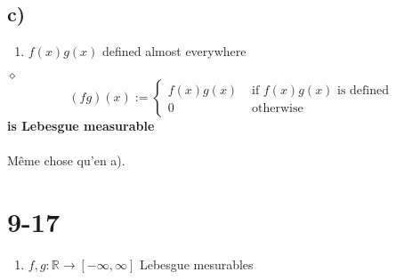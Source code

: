 \documentclass[a4paper,10pt]{article}
\begin{document}
\subsection*{c)}
\begin{enumerate}
	\item $f(x)g(x)$ defined almost everywhere
\end{enumerate}
$\diamond$ 
$$
	(fg)(x) := 
	\begin{cases}
		f(x)g(x) & \text{ if } f(x)g(x) \text{ is defined} \\
		0 & \text{ otherwise}
	\end{cases}
$$
\textbf{ is Lebesgue measurable}
\\
\\
Même chose qu'en a).

\section*{9-17}
\begin{enumerate}
	\item $f,g : \mathbb{R} \rightarrow [-\infty, \infty]$ Lebesgue mesurables
\end{enumerate}
\end{document}
